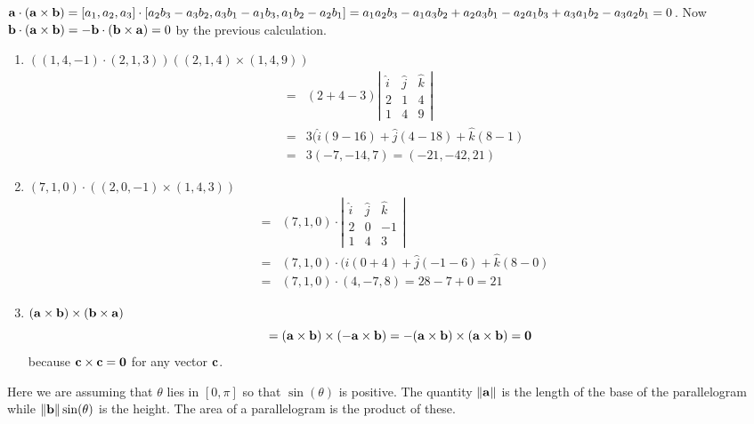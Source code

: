 \vspace{2mm}
$\aa\cdot(\aa\times\bb) = [a_1, a_2, a_3]\cdot [a_2 b_3 - a_3 b_2, a_3 b_1- a_1 b_3,
a_1 b_2 - a_2 b_1] = a_1 a_2 b_3 - a_1 a_3 b_2 + a_2 a_3 b_1 - a_2 a_1 b_3
+ a_3 a_1 b_2 - a_3 a_2 b_1 = 0$. Now $\bb\cdot(\aa\times\bb) = -\bb\cdot(\bb\times\aa)
= 0$ by the previous calculation.

\vspace{2mm}
{\begin{enumerate}
\renewcommand{\labelenumi}{(\alph{enumi})}
\item $((1,4,-1)\cdot(2,1,3)) ((2,1,4) \times (1,4,9))$
\begin{eqnarray*}
 & = & (2+4-3) \left| \begin{array}{ccc} 
\hat{i} & \hat{j} & \hat{k} \\
2 & 1 & 4 \\
1 & 4 & 9 
\end{array} \right| \\
 & = & 3 (\hat{i} (9-16) + \hat{j}(4-18) + \hat{k}(8-1) \\
 & = & 3 (-7,-14,7) = (-21,-42,21) 
\end{eqnarray*}
\item $(7,1,0)\cdot ((2,0,-1) \times (1,4,3))$
\begin{eqnarray*}
 & = & (7,1,0) \cdot \left| \begin{array}{ccc}
\hat{i} & \hat{j} & \hat{k} \\
2 & 0 & -1 \\
1 & 4 & 3
\end{array} \right| \\
 & = & (7,1,0) \cdot (\hat{i} (0+4) + \hat{j}(-1-6) + \hat{k}(8-0) \\
 & = & (7,1,0) \cdot (4,-7,8) = 28-7+0 = 21
\end{eqnarray*}
\item $(\aa \times \bb) \times (\bb \times \aa)$
\[
= (\aa \times \bb) \times (- \aa \times \bb) = 
   - (\aa \times \bb) \times (\aa \times \bb) = {\bf 0} 
\]
because $\cc \times \cc = {\bf 0}$ for any vector $\cc$. 
\end{enumerate}}

\vspace{2mm}
Here we are assuming that $\theta$ lies in $[0, \pi]$ so that $\sin(\theta)$ is
positive. The quantity $\|\aa\|$ is the length of the base of the parallelogram
while $\|\bb\|\sin(\theta)$ is the height. The area of a parallelogram is the
product of these. 

